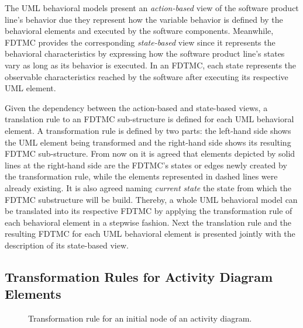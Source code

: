 The UML behavioral models present an \emph{action-based} view of the software
product line's behavior due they represent how the variable behavior is defined
by the behavioral elements and executed by the software components. Meanwhile,
FDTMC provides the corresponding \emph{state-based} view since it represents the
behavioral characteristics by expressing how the software product line's states
vary as long as its behavior is executed. In an FDTMC, each state represents the
observable characteristics reached by the software after executing its
respective UML element. 

Given the dependency between the action-based and state-based views, a
translation rule to an FDTMC sub-structure is defined for each UML behavioral element. A
transformation rule is defined by two parts: the left-hand side shows the
UML element being transformed and the right-hand side shows its resulting FDTMC
sub-structure. From now on it is agreed that elements depicted by solid lines at
the right-hand side are the FDTMC's states or edges newly created by the
transformation rule, while the elements represented in dashed lines were already
existing. It is also agreed naming \emph{current state} the state from which the
FDTMC substructure will be build. Thereby, a whole UML behavioral model can be
translated into its respective FDTMC by applying the transformation rule of each
behavioral element in a stepwise fashion. Next the translation rule and the
resulting FDTMC for each UML behavioral element is presented jointly with the
description of its state-based view.

\subsection{Transformation Rules for Activity Diagram Elements
	\label{subsec:transfomrationRulesActivityDiagramElements}}










\begin{figure}[h!]
\begin{center}
\begin{tikzpicture}
	\centering
	
\end{tikzpicture}
\end{center}
\caption{Transformation rule for an initial node of an activity diagram.}
\label{fig:transInit_AD}
\end{figure}

